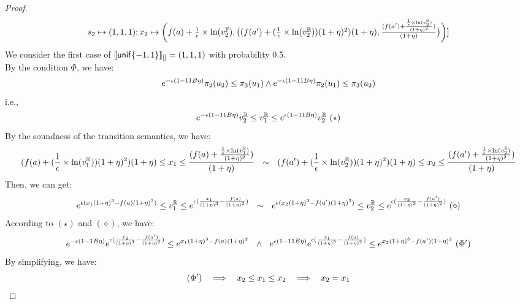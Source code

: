 \documentclass[a4paper,11pt]{article}
\begin{document}
\begin{proof}
\[\begin{array}{ll}
	 s_2 \mapsto (1, 1, 1); 
	 x_2 \mapsto \bigg(
				f(a) + \frac{1}{\epsilon} \times \ln(v^{\mathbb{F}}_2),
				\big( (f(a') + 
				(\frac{1}{\epsilon} \times \ln(v^{\mathbb{R}}_2))
				(1 + \eta)^2)
				{(1 + \eta)},
				\frac{(
				f(a') + \frac{\frac{1}{\epsilon} 
				\times \ln(v^{\mathbb{R}}_2)}
				{(1 + \eta)^2}
				)}
				{(1 + \eta)}
				 \big)
				\bigg)]	
	\end{array}
\]
We consider the first case of $\llbracket \mathsf{unif}\{-1, 1\} \rrbracket_{[]} = (1, 1, 1)$ with probability 0.5.
\\
By the condition $\Phi$, we have:
\[
	e^{-\epsilon(1 - 11B\eta)} \pi_2(u_2) \leq \pi_3 (u_1) 
	\land 
	e^{-\epsilon(1 - 11B\eta)} \pi_2 (u_1) \leq \pi_3 (u_2)
\]
i.e.,
\[
	e^{-\epsilon(1 - 11B\eta)} \rval_2 \leq \rval_1
	\leq e^{\epsilon(1 - 11B\eta)} \rval_2
	 ~ (\star)
\]
By the soundness of the transition semantics, we have:
\[
	(f(a) + (\frac{1}{\epsilon} \times \ln(v^{\mathbb{R}}_1))
	(1 + \eta)^2){(1 + \eta)}
	\leq x_1 \leq
	\frac{(f(a) + \frac{\frac{1}{\epsilon} 
	\times \ln(v^{\mathbb{R}}_1)}{(1 + \eta)^2})}
	{(1 + \eta)}
	~~ \sim ~~
	(f(a') + (\frac{1}{\epsilon} \times \ln(v^{\mathbb{R}}_2))
	(1 + \eta)^2){(1 + \eta)}
	\leq x_2 \leq
	\frac{(f(a') + \frac{\frac{1}{\epsilon} 
	\times \ln(v^{\mathbb{R}}_2)}
	{(1 + \eta)^2} )}{(1 + \eta)}
\]
Then, we can get:
\[
	e^{\epsilon(x_1 (1 + \eta)^3 - f(a)(1 + \eta)^2)}
	\leq v^{\mathbb{R}}_1 \leq
	e^{\epsilon(\frac{x_1}{(1 + \eta)^3}  - \frac{f(a)}{(1 + \eta)^2})}
	~~ \sim ~~
	e^{\epsilon(x_2 (1 + \eta)^3 - f(a')(1 + \eta)^2)}
	\leq v^{\mathbb{R}}_2 \leq
	e^{\epsilon(\frac{x_2}{(1 + \eta)^3}  - \frac{f(a')}{(1 + \eta)^2})} ~ (\diamond)
\]
According to $(\star)$ and $(\diamond)$, we have:
\[
		e^{-\epsilon(1 - 1B\eta)} 
		e^{\epsilon (\frac{x_2}{(1 + \eta)^3} - \frac{f(a')}{(1 + \eta)^2})}
		\leq 
		e^{x_1(1 + \eta)^3 - f(a)(1 + \eta)^2}
		~~ \land ~~
		e^{\epsilon(1 - 11B\eta)} 
		e^{\epsilon (\frac{x_1}{(1 + \eta)^3} - \frac{f(a)}{(1 + \eta)^2})}
		\leq 
		e^{x_2(1 + \eta)^3 - f(a')(1 + \eta)^2} ~ (\Phi')
\]
By simplifying, we have:
\[
	(\Phi')	
	~~ \implies ~~
	x_2 \leq x_1 \leq x_2 
	~~ \implies ~~
	x_2 = x_1
\]

\end{proof}

\newpage


\end{document}
